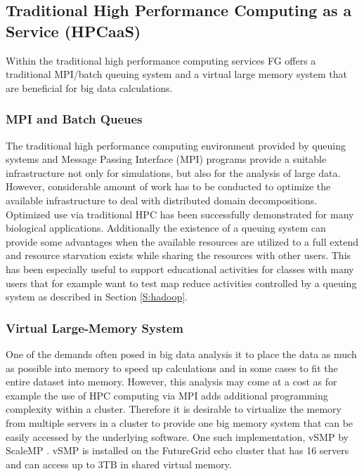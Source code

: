 \documentclass{article}
\begin{document}
\subsection{Traditional High Performance Computing as a Service (HPCaaS)}

Within the traditional high performance computing services FG offers a traditional MPI/batch queuing system and a virtual large memory system that are beneficial for big data calculations.

\subsubsection{MPI and Batch Queues}

The traditional high performance computing environment provided by queuing systems and Message Passing Interface (MPI) programs provide a suitable infrastructure not only for simulations, but also for the analysis of large data. However, considerable amount of work has to be conducted to optimize the available infrastructure to deal with distributed domain decompositions. Optimized use via traditional HPC has been successfully demonstrated for many biological applications. Additionally the existence of a queuing system can provide some advantages when the available resources are utilized to a full extend and resource starvation exists while sharing the resources with other users. This has been especially useful to support educational activities for classes with many users that for example want to test map reduce activities controlled by a queuing system as described in Section \ref{S:hadoop}.

\subsubsection{Virtual Large-Memory System}

One of the demands often posed in big data analysis it to place the data as much as possible into memory to speed up calculations and in some cases to fit the entire dataset into memory. However, this analysis may come at a cost as for example the use of HPC computing via MPI adds additional programming complexity within a cluster. Therefore it is desirable to virtualize the memory from multiple servers in a cluster to provide one big memory system that can be easily accessed by the underlying software.  One such implementation, vSMP by ScaleMP \cite{www-scalemp} \cite{las12fg-bookchapter}. vSMP is installed on the FutureGrid echo cluster that has 16 servers and can access up to 3TB in shared virtual memory.
\end{document}
